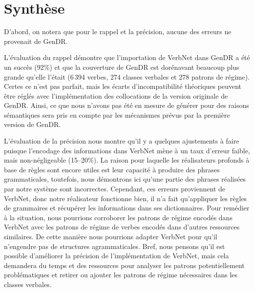 \section{Synthèse}
D'abord, on notera que pour le rappel et la précision, aucune des erreurs ne provenait de GenDR.

L'évaluation du rappel démontre que l'importation de VerbNet dans GenDR a été un succès (92\%) et que la couverture de GenDR est dorénavant beaucoup plus grande qu'elle l'était (6\,394 verbes, 274 classes verbales et 278 patrons de régime). Certes ce n'est pas parfait, mais les écarts d'incompatibilité théoriques peuvent être réglés avec l'implémentation des collocations de la version originale de GenDR. Ainsi, ce que nous n'avons pas été en mesure de générer pour des raisons sémantiques sera pris en compte par les mécanismes prévus par la première version de GenDR.

L'évaluation de la précision nous montre qu'il y a quelques ajustements à faire puisque l'encodage des informations dans VerbNet mène à un taux d'erreur faible, mais non-négligeable (15--20\%). La raison pour laquelle les réalisateurs profonds à base de règles sont encore utiles est leur capacité à produire des phrases grammaticales, toutefois, nous démontrons ici qu'une partie des phrases réalisées par notre système sont incorrectes. Cependant, ces erreurs proviennent de VerbNet, donc notre réalisateur fonctionne bien, il n'a fait qu'appliquer les règles de grammaires et récupérer les informations dans ses dictionnaires. Pour remédier à la situation, nous pourrions corroborer les patrons de régime encodés dans VerbNet avec les patrons de régime de verbes encodés dans d'autres ressources similaires. De cette manière nous pourrions adapter VerbNet pour qu'il n'engendre pas de structures agrammaticales. Bref, nous pensons qu'il est possible d'améliorer la précision de l'implémentation de VerbNet, mais cela demandera du temps et des ressources pour analyser les patrons potentiellement problématiques et retirer ou ajouter les patrons de régime nécessaires dans les classes verbales.

